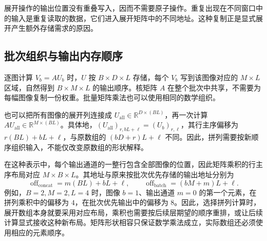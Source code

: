 展开操作的输出位置没有重叠写入，因而不需要原子操作。重复出现在不同窗口中的输入是重复读取的数据，它们进入展开矩阵中的不同地址。这种复制正是显式展开产生额外存储需求的原因。

\subsection{批次组织与输出内存顺序}
\label{l11:subsec:batch_layout}

逐图计算 $V_b=AU_b$ 时，$U$ 按 $B\times D\times L$ 存储，每个 $V_b$ 写到该图像对应的 $M\times L$ 区域，自然得到 $B\times M\times L$ 的输出顺序。核矩阵 $A$ 在整个批次中共享，不需要为每幅图像复制一份权重。批量矩阵乘法也可以使用相同的数学组织。

也可以把所有图像的展开列连接成 $U_{\mathrm{all}}\in\mathbb{R}^{D\times(BL)}$，再一次计算 $A U_{\mathrm{all}}\in\mathbb{R}^{M\times(BL)}$。具体地，$(U_{\mathrm{all}})_{r,bL+\ell}=(U_b)_{r,\ell}$，其行主序偏移为 $r(BL)+bL+\ell$，与原数组的 $(bD+r)L+\ell$ 不同。因此，拼列需要按新顺序组织输入，不能仅改变原数组的形状解释。

在这种表示中，每个输出通道的一整行包含全部图像的位置，因此矩阵乘积的行主序布局对应 $M\times B\times L$。其地址与原来按批次优先存储的输出地址分别为
\begin{equation}
  \operatorname{off}_{\mathrm{concat}}=m(BL)+bL+\ell,
  \qquad
  \operatorname{off}_{\mathrm{batch}}=(bM+m)L+\ell.
  \label{l11:eq:batch_order}
\end{equation}
例如，$B=2,M=2,L=4$ 时，图像 $b=1$、输出通道 $m=0$ 的第一个元素，在拼列乘积中的偏移为 $4$，在批次优先输出中的偏移为 $8$。因此，选择拼列计算时，展开数组本身就要采用对应布局，乘积也需要按后续层期望的顺序重排，或让后续计算显式接收这种新布局。矩阵形状相容只保证数学乘法成立，实际数组还必须使用相应的元素顺序。
